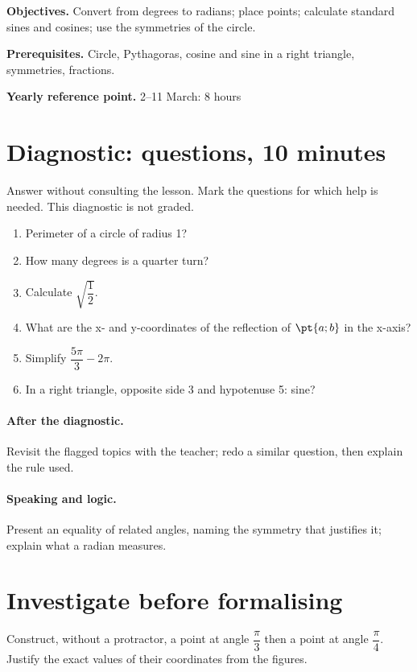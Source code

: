 \label{C10}
\begin{keypoint}
\textbf{Objectives.} Convert from degrees to radians; place points; calculate standard sines and cosines; use the symmetries of the circle.

\textbf{Prerequisites.} Circle, Pythagoras, cosine and sine in a right triangle, symmetries, fractions.

\textbf{Yearly reference point.} 2--11 March: 8 hours\end{keypoint}
\section*{Diagnostic:  questions, 10 minutes}\label{C10-D}
Answer without consulting the lesson. Mark the questions for which help is needed. This diagnostic is not graded.
\begin{enumerate}
\item Perimeter of a circle of radius 1?
\item How many degrees is a quarter turn?
\item Calculate $\sqrt {\dfrac{1}{2}}$.
\item What are the x- and y-coordinates of the reflection of $\pt{a;b}$ in the x-axis?
\item Simplify $\dfrac{5\pi}{3}-2\pi $.
\item In a right triangle, opposite side 3 and hypotenuse 5: sine?
\end{enumerate}
\paragraph{After the diagnostic.} Revisit the flagged topics with the teacher; redo a similar question, then explain the rule used.
\paragraph{Speaking and logic.} Present an equality of related angles, naming the symmetry that justifies it; explain what a radian measures.
\mxnewpage
\section*{Investigate before formalising}\label{C10-RECH}
Construct, without a protractor, a point at angle $\dfrac{\pi}{3}$ then a point at angle $\dfrac{\pi}{4}$. Justify the exact values of their coordinates from the figures.
